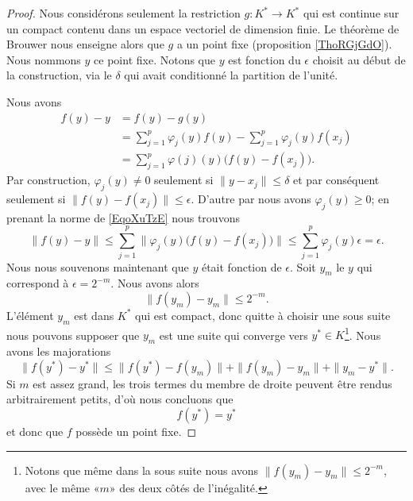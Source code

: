 \begin{proof}
    Nous considérons seulement la restriction \( g\colon K^*\to K^*\) qui est continue sur un compact contenu dans un espace vectoriel de dimension finie. Le théorème de Brouwer nous enseigne alors que \( g\) a un point fixe (proposition \ref{ThoRGjGdO}). Nous nommons \( y\) ce point fixe. Notons que \( y\) est fonction du \( \epsilon\) choisit au début de la construction, via le \( \delta\) qui avait conditionné la partition de l'unité.

    Nous avons
    \begin{subequations}        \label{EqoXuTzE}
        \begin{align}
            f(y)-y&=f(y)-g(y)\\
            &=\sum_{j=1}^p\varphi_j(y)f(y)-\sum_{j=1}^p\varphi_j(y)f(x_j)\\
            &=\sum_{j=1}^p\varphi(j)(y)\big( f(y)-f(x_j) \big).
        \end{align}
    \end{subequations}
    Par construction, \( \varphi_j(y)\neq 0\) seulement si \( \| y-x_j \|\leq \delta\) et par conséquent seulement si \( \| f(y)-f(x_j) \|\leq \epsilon\). D'autre par nous avons \( \varphi_j(y)\geq 0\); en prenant la norme de \eqref{EqoXuTzE} nous trouvons
    \begin{equation}
        \| f(y)-y \|\leq \sum_{j=1}^p\| \varphi_j(y)\big( f(y)-f(x_j) \big) \|\leq \sum_{j=1}^p\varphi_j(y)\epsilon=\epsilon.
    \end{equation}
    Nous nous souvenons maintenant que \( y\) était fonction de \( \epsilon\). Soit \( y_m\) le \( y\) qui correspond à \( \epsilon=2^{-m}\). Nous avons alors
    \begin{equation}
        \| f(y_m)-y_m \|\leq 2^{-m}.
    \end{equation}
    L'élément \( y_m\) est dans \( K^*\) qui est compact, donc quitte à choisir une sous suite nous pouvons supposer que \( y_m\) est une suite qui converge vers \( y^*\in K\)\footnote{Notons que même dans la sous suite nous avons \( \| f(y_m)-y_m \|\leq 2^{-m}\), avec le même «\( m\)» des deux côtés de l'inégalité.}. Nous avons les majorations
    \begin{equation}
        \| f(y^*)-y^* \|\leq \| f(y^*)-f(y_m) \|+\| f(y_m)-y_m \|+\| y_m-y^* \|.
    \end{equation}
    Si \( m\) est assez grand, les trois termes du membre de droite peuvent être rendus arbitrairement petits, d'où nous concluons que
    \begin{equation}
        f(y^*)=y^*
    \end{equation}
    et donc que \( f\) possède un point fixe.
\end{proof}

